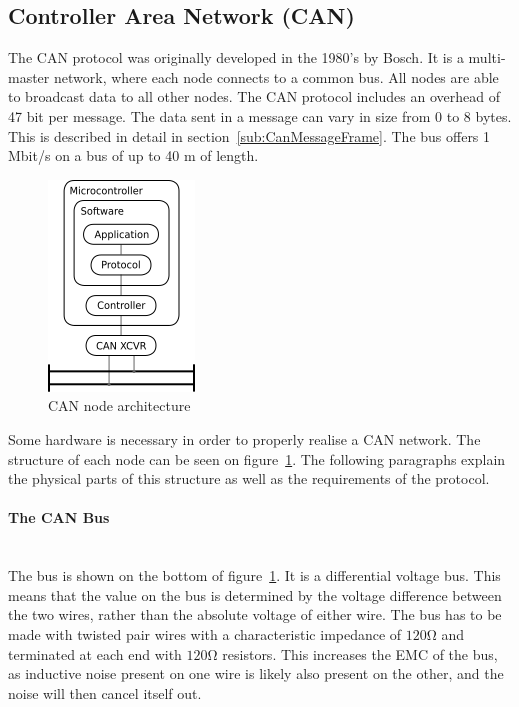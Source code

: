 
\subsection{Controller Area Network (CAN)}\label{sec:canbusanalysis}
The CAN protocol was originally developed in the 1980's by Bosch.
It is a multi-master network, where each node connects to a common bus.
All nodes are able to broadcast data to all other nodes.
The CAN protocol includes an overhead of 47 bit per message.
The data sent in a message can vary in size from 0 to 8 bytes.
This is described in detail in section~\ref{sub:CanMessageFrame}.
The bus offers 1 Mbit/s on a bus of up to 40 \si{\metre} of length.

\begin{figure}[h!]
	\centering
	\includegraphics{graphics/canbus_setup}
	\caption{CAN node architecture}
	\label{fig:canbus_setup}
\end{figure}

Some hardware is necessary in order to properly realise a CAN network.
The structure of each node can be seen on figure~\ref{fig:canbus_setup}.
The following paragraphs explain the physical parts of this structure as well as the requirements of the protocol.

\paragraph*{The CAN Bus}~\\
The bus is shown on the bottom of figure~\ref{fig:canbus_setup}.
It is a differential voltage bus.
This means that the value on the bus is determined by the voltage difference between the two wires, rather than the absolute voltage of either wire.
The bus has to be made with twisted pair wires with a characteristic impedance of $\si{120 \ohm}$ and terminated at each end with $\si{120 \ohm}$ resistors.
This increases the EMC of the bus, as inductive noise present on one wire is likely also present on the other, and the noise will then cancel itself out.

